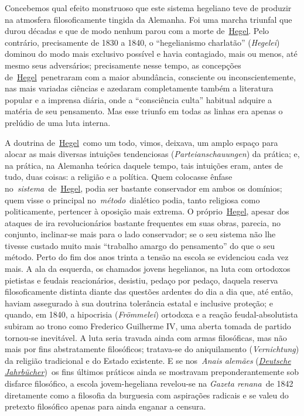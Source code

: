 Concebemos qual efeito monstruoso que este sistema hegeliano teve de
produzir na atmosfera filosoficamente tingida da Alemanha. Foi uma
marcha triunfal que durou décadas e que de modo nenhum parou com a morte
de~\href{https://www.marxists.org/portugues/dicionario/verbetes/h/hegel.htm}{Hegel}.
Pelo contrário, precisamente de 1830 a 1840, o ``hegelianismo
charlatão'' (\emph{Hegelei}) dominou do modo mais exclusivo possível e
havia contagiado, mais ou menos, até mesmo seus adversários;
precisamente nesse tempo, as concepções
de~\href{https://www.marxists.org/portugues/dicionario/verbetes/h/hegel.htm}{Hegel}~penetraram
com a maior abundância, consciente ou inconscientemente, nas mais
variadas ciências e azedaram completamente também a literatura popular e
a imprensa diária, onde a ``consciência culta'' habitual adquire a
matéria de seu pensamento. Mas esse triunfo em todas as linhas era
apenas o prelúdio de uma luta interna.

A doutrina
de~\href{https://www.marxists.org/portugues/dicionario/verbetes/h/hegel.htm}{Hegel}~como
um todo, vimos, deixava, um amplo espaço para alocar as mais diversas
intuições tendenciosas (\emph{Parteianschauungen}) da prática; e, na
prática, na Alemanha teórica daquele tempo, tais intuições eram, antes
de tudo, duas coisas: a religião e a política. Quem colocasse ênfase
no~\emph{sistema~}de~\href{https://www.marxists.org/portugues/dicionario/verbetes/h/hegel.htm}{Hegel},
podia ser bastante conservador em ambos os domínios; quem visse o
principal no~\emph{método~}dialético podia, tanto religiosa como
politicamente, pertencer à oposição mais extrema. O
próprio~\href{https://www.marxists.org/portugues/dicionario/verbetes/h/hegel.htm}{Hegel},
apesar dos ataques de ira revolucionários bastante frequentes em suas
obras, parecia, no conjunto, inclinar-se mais para o lado conservador;
se o seu sistema não lhe tivesse custado muito mais ``trabalho amargo do
pensamento'' do que o seu método. Perto do fim dos anos trinta a tensão
na escola se evidenciou cada vez mais. A ala da esquerda, os chamados
jovens hegelianos, na luta com ortodoxos pietistas e feudais
reacionários, desistiu, pedaço por pedaço, daquela reserva
filosoficamente distinta diante das questões ardentes do dia a dia que,
até então, haviam assegurado à sua doutrina tolerância estatal e
inclusive proteção; e quando, em 1840, a hipocrisia (\emph{Frömmelei})
ortodoxa e a reação feudal-absolutista subiram ao trono como Frederico
Guilherme IV, uma aberta tomada de partido tornou-se inevitável. A luta
seria travada ainda com armas filosóficas, mas não mais por fins
abstratamente filosóficos; tratava-se do aniquilamento
(\emph{Vernichtung}) da religião tradicional e do Estado existente. E se
nos~\emph{Anais alemães}
(\href{https://www.marxists.org/portugues/dicionario/verbetes/d/deutsche_jahrbucher.htm}{\emph{Deutsche
Jahrbücher}})\emph{~}os fins últimos práticos ainda se mostravam
preponderantemente sob disfarce filosófico, a escola jovem-hegeliana
revelou-se na \emph{Gazeta renana~}de 1842 diretamente como a filosofia
da burguesia com aspirações radicais e se valeu do pretexto filosófico
apenas para ainda enganar a censura.

